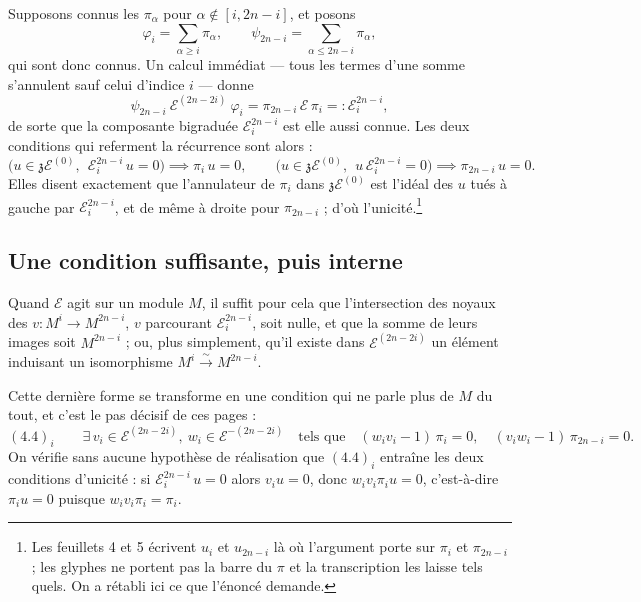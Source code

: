 \documentclass[11pt,a4paper]{article}
\begin{document}
Supposons connus les $\pi_{\alpha}$ pour $\alpha \notin [i, 2n-i]$, et posons
\[
\varphi_{i} = \sum_{\alpha \geqslant i} \pi_{\alpha},
\qquad
\psi_{2n-i} = \sum_{\alpha \leqslant 2n-i} \pi_{\alpha},
\]
qui sont donc connus. Un calcul immédiat --- tous les termes d'une somme
s'annulent sauf celui d'indice $i$ --- donne
\[
\psi_{2n-i}\ \mathcal{E}^{(2n-2i)}\ \varphi_{i}
= \pi_{2n-i}\,\mathcal{E}\,\pi_{i}
=: \mathcal{E}^{2n-i}_{i},
\]
de sorte que la composante bigraduée $\mathcal{E}^{2n-i}_{i}$ est elle aussi
connue. Les deux conditions qui referment la récurrence sont alors :
\[
\bigl( u \in \mathfrak{z}\mathcal{E}^{(0)},\ \ \mathcal{E}^{2n-i}_{i}\,u = 0 \bigr)
\implies \pi_{i}\,u = 0,
\qquad
\bigl( u \in \mathfrak{z}\mathcal{E}^{(0)},\ \ u\,\mathcal{E}^{2n-i}_{i} = 0 \bigr)
\implies \pi_{2n-i}\,u = 0 .
\]
Elles disent exactement que l'annulateur de $\pi_{i}$ dans
$\mathfrak{z}\mathcal{E}^{(0)}$ est l'idéal des $u$ tués à gauche par
$\mathcal{E}^{2n-i}_{i}$, et de même à droite pour $\pi_{2n-i}$ ; d'où
l'unicité.\footnote{Les feuillets 4 et 5 écrivent $u_{i}$ et $u_{2n-i}$ là où
l'argument porte sur $\pi_{i}$ et $\pi_{2n-i}$ ; les glyphes ne portent pas la
barre du $\pi$ et la transcription les laisse tels quels. On a rétabli ici ce
que l'énoncé demande.}

\subsection*{Une condition suffisante, puis interne}

Quand $\mathcal{E}$ agit sur un module $M$, il suffit pour cela que
l'intersection des noyaux des $v \colon M^{i} \to M^{2n-i}$, $v$ parcourant
$\mathcal{E}^{2n-i}_{i}$, soit nulle, et que la somme de leurs images soit
$M^{2n-i}$ ; ou, plus simplement, qu'il existe dans $\mathcal{E}^{(2n-2i)}$ un
élément induisant un isomorphisme $M^{i} \xrightarrow{\ \sim\ } M^{2n-i}$.

Cette dernière forme se transforme en une condition qui ne parle plus de $M$
du tout, et c'est le pas décisif de ces pages :
\[
(4.4)_{i} \qquad
\exists\, v_{i} \in \mathcal{E}^{(2n-2i)},\ w_{i} \in \mathcal{E}^{-(2n-2i)}
\quad\text{tels que}\quad
(w_{i}v_{i} - 1)\,\pi_{i} = 0, \quad (v_{i}w_{i} - 1)\,\pi_{2n-i} = 0 .
\]
On vérifie sans aucune hypothèse de réalisation que $(4.4)_{i}$ entraîne les
deux conditions d'unicité : si $\mathcal{E}^{2n-i}_{i}\,u = 0$ alors
$v_{i}u = 0$, donc $w_{i}v_{i}\pi_{i}u = 0$, c'est-à-dire $\pi_{i}u = 0$
puisque $w_{i}v_{i}\pi_{i} = \pi_{i}$.
\end{document}
